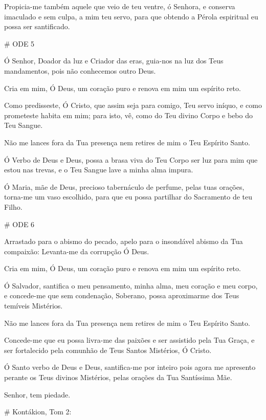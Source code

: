 \documentclass{subfiles}
\begin{document}
\Doxology{}

Propicia-me também aquele que veio de teu ventre, ó Senhora, e conserva
imaculado e sem culpa, a mim teu servo, para que obtendo a Pérola espiritual eu
possa ser santificado.

# ODE 5

\eirmos{}Ó Senhor, Doador da luz e Criador das eras, guia-nos na luz dos Teus
mandamentos, pois não conhecemos outro Deus.

Cria em mim, Ó Deus, um coração puro e renova em mim um espírito reto.

Como predisseste, Ó Cristo, que assim seja para comigo, Teu servo
iníquo, e como prometeste habita em mim; para isto, vê, como do Teu divino
Corpo e bebo do Teu Sangue.

Não me lances fora da Tua presença nem retires de mim o Teu Espírito Santo.

Ó Verbo de Deus e Deus, possa a brasa viva do Teu Corpo ser luz para
mim que estou nas trevas, e o Teu Sangue lave a minha alma impura.

\Doxology{}

Ó Maria, mãe de Deus, precioso tabernáculo de perfume, pelas tuas
orações, torna-me um vaso escolhido, para que eu possa partilhar do
Sacramento de teu Filho.

# ODE 6

\eirmos{}Arrastado para o abismo do pecado, apelo para o insondável abismo da
Tua compaixão: Levanta-me da corrupção Ó Deus.

Cria em mim, Ó Deus, um coração puro e renova em mim um espírito reto.

Ó Salvador, santifica o meu pensamento, minha alma, meu coração e meu corpo, e
concede-me que sem condenação, Soberano, possa aproximarme dos Teus temíveis
Mistérios.

Não me lances fora da Tua presença nem retires de mim o Teu Espírito Santo.

Concede-me que eu possa livra-me das paixões e ser assistido pela Tua Graça,
e ser fortalecido pela comunhão de Teus Santos Mistérios, Ó Cristo.

\Doxology{}

Ó Santo verbo de Deus e Deus, santifica-me por inteiro pois agora me apresento
perante os Teus divinos Mistérios, pelas orações da Tua Santíssima Mãe.

Senhor, tem piedade. 

\Doxology{}

# Kontákion, Tom 2:
\end{document}
